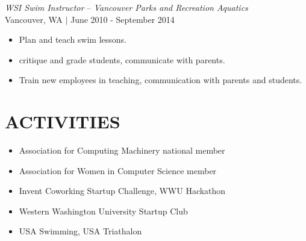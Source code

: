 \documentclass[line,margin]{res}
\begin{document}
\begin{resume}
	{\sl WSI Swim Instructor} -- {\sl Vancouver Parks and Recreation Aquatics} \\
	{\footnotesize Vancouver, WA $|$  June 2010 - September 2014} \\
	\begin{itemize}  \itemsep -2pt
		\item Plan and teach swim lessons.
		\item critique and grade students, communicate with parents.
		\item Train new employees in teaching, communication with parents and students.
	\end{itemize}

\section{ACTIVITIES}
	\begin{itemize} \itemsep -3pt
	\item Association for Computing Machinery national member
	\item Association for Women in Computer Science member
	\item Invent Coworking Startup Challenge, WWU Hackathon
	\item Western Washington University Startup Club
	\item USA Swimming, USA Triathalon
	\end{itemize}


\end{resume}
\end{document}
